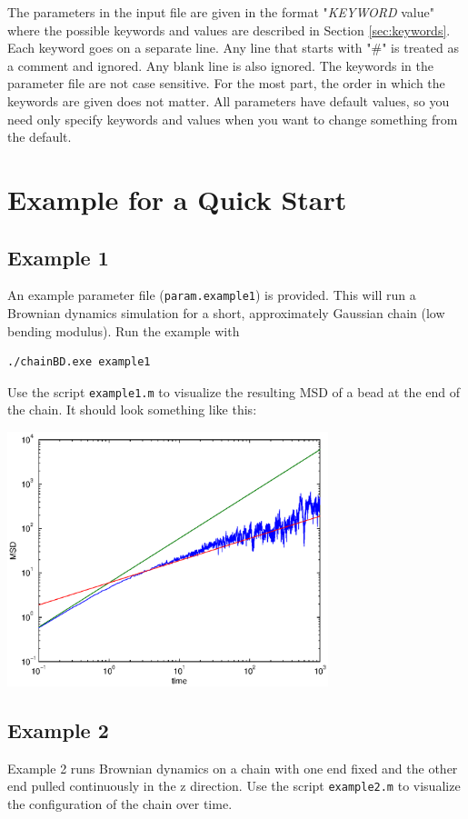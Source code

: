 \documentclass[12pt]{article}
\begin{document}
The parameters in the input file are given in the format "{\em KEYWORD} value" where the possible keywords and values are described
in Section \ref{sec:keywords}. Each keyword goes on a separate
line. Any line that starts with "\#" is treated as a comment and
ignored. Any blank line is also ignored. The keywords in the parameter
file are not case sensitive. For the most part, the order in which the
keywords are given does not matter. All parameters have default
values, so you need only specify keywords and values when you want to
change something from the default.


\section{Example for a Quick Start}
\subsection{Example 1}
An example parameter file (\verb=param.example1=) is provided. This will run a Brownian dynamics simulation for a short, approximately Gaussian chain (low bending modulus). Run the example with 
\begin{verbatim}
./chainBD.exe example1
\end{verbatim}

Use the script \verb=example1.m= to visualize the resulting MSD of a bead at the end of the chain. It should look something like this:

\centerline{\includegraphics[width=0.7\textwidth]{example_MSD.eps}}

\subsection{Example 2}
Example 2 runs Brownian dynamics on a chain with one end fixed and the other end pulled continuously in the z direction. Use the script \verb=example2.m= to visualize the configuration of the chain over time.
\end{document}
